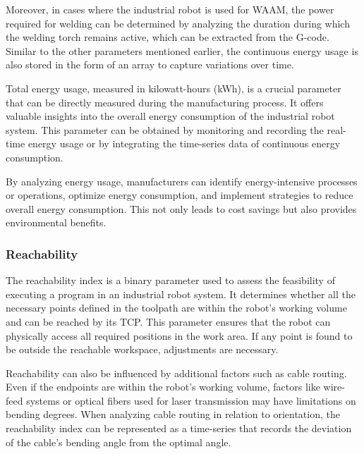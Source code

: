 Moreover, in cases where the industrial robot is used for WAAM, the power required for welding can be determined by analyzing the duration during which the welding torch remains active, which can be extracted from the G-code. Similar to the other parameters mentioned earlier, the continuous energy usage is also stored in the form of an array to capture variations over time.

Total energy usage, measured in kilowatt-hours (kWh), is a crucial parameter that can be directly measured during the manufacturing process. It offers valuable insights into the overall energy consumption of the industrial robot system. This parameter can be obtained by monitoring and recording the real-time energy usage or by integrating the time-series data of continuous energy consumption.

By analyzing energy usage, manufacturers can identify energy-intensive processes or operations, optimize energy consumption, and implement strategies to reduce overall energy consumption. This not only leads to cost savings but also provides environmental benefits.



\subsubsection*{Reachability}
The reachability index is a binary parameter used to assess the feasibility of executing a program in an industrial robot system. It determines whether all the necessary points defined in the toolpath are within the robot's working volume and can be reached by its TCP. This parameter ensures that the robot can physically access all required positions in the work area. If any point is found to be outside the reachable workspace, adjustments are necessary.

Reachability can also be influenced by additional factors such as cable routing. Even if the endpoints are within the robot's working volume, factors like wire-feed systems or optical fibers used for laser transmission may have limitations on bending degrees. When analyzing cable routing in relation to orientation, the reachability index can be represented as a time-series that records the deviation of the cable's bending angle from the optimal angle.

